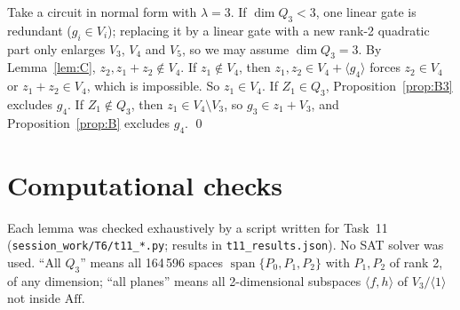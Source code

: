 \documentclass[11pt,a4paper]{article}
\theoremstyle{plain}
\theoremstyle{definition}
\theoremstyle{remark}
\newcommand{\Aff}{\mathrm{Aff}}
\newcommand{\Span}{\operatorname{span}}
\begin{document}
Take a circuit in normal form with $\lambda=3$. If $\dim Q_3<3$, one linear gate is redundant ($g_i\in V_i$); replacing it by a linear gate with a new rank-2 quadratic part only enlarges $V_3$, $V_4$ and $V_5$, so we may assume $\dim Q_3=3$. By Lemma~\ref{lem:C}, $z_2,z_1+z_2\notin V_4$. If $z_1\notin V_4$, then $z_1,z_2\in V_4+\langle g_4\rangle$ forces $z_2\in V_4$ or $z_1+z_2\in V_4$, which is impossible. So $z_1\in V_4$.
If $Z_1\in Q_3$, Proposition~\ref{prop:B3} excludes $g_4$.
If $Z_1\notin Q_3$, then $z_1\in V_4\setminus V_3$, so $g_3\in z_1+V_3$, and Proposition~\ref{prop:B} excludes $g_4$. \qed

\section{Computational checks}

Each lemma was checked exhaustively by a script written for Task~11 (\texttt{session\_work/T6/t11\_*.py}; results in \texttt{t11\_results.json}). No SAT solver was used. ``All $Q_3$'' means all 164\,596 spaces $\Span\{P_0,P_1,P_2\}$ with $P_1,P_2$ of rank 2, of any dimension; ``all planes'' means all 2-dimensional subspaces $\langle f,h\rangle$ of $V_3/\langle1\rangle$ not inside $\Aff$.
\end{document}
